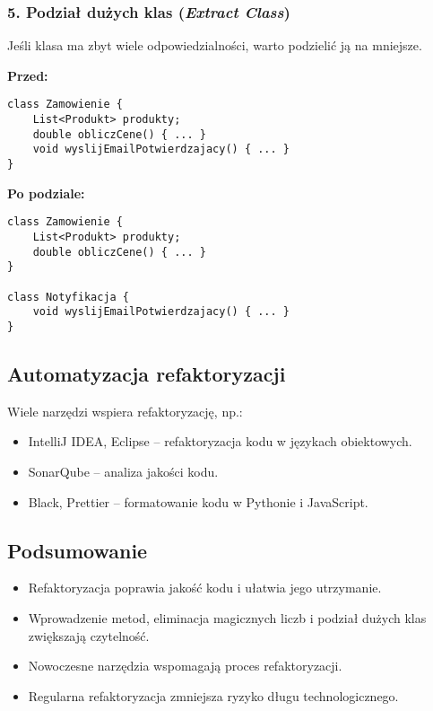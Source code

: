 \subsubsection{5. Podział dużych klas (\textit{Extract Class})}
Jeśli klasa ma zbyt wiele odpowiedzialności, warto podzielić ją na mniejsze.

\textbf{Przed:}
\begin{verbatim}
class Zamowienie {
    List<Produkt> produkty;
    double obliczCene() { ... }
    void wyslijEmailPotwierdzajacy() { ... }
}
\end{verbatim}

\textbf{Po podziale:}
\begin{verbatim}
class Zamowienie {
    List<Produkt> produkty;
    double obliczCene() { ... }
}

class Notyfikacja {
    void wyslijEmailPotwierdzajacy() { ... }
}
\end{verbatim}

\subsection{Automatyzacja refaktoryzacji}
Wiele narzędzi wspiera refaktoryzację, np.:
\begin{itemize}
    \item IntelliJ IDEA, Eclipse – refaktoryzacja kodu w językach obiektowych.
    \item SonarQube – analiza jakości kodu.
    \item Black, Prettier – formatowanie kodu w Pythonie i JavaScript.
\end{itemize}

\subsection{Podsumowanie}
\begin{itemize}
    \item Refaktoryzacja poprawia jakość kodu i ułatwia jego utrzymanie.
    \item Wprowadzenie metod, eliminacja magicznych liczb i podział dużych klas zwiększają czytelność.
    \item Nowoczesne narzędzia wspomagają proces refaktoryzacji.
    \item Regularna refaktoryzacja zmniejsza ryzyko długu technologicznego.
\end{itemize}
